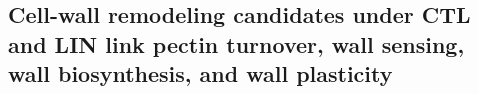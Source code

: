 \documentclass[9pt,twocolumn,twoside]{rilabRxiv}
\begin{document}



\subsection{Cell-wall remodeling candidates under CTL and LIN link pectin turnover, wall sensing, wall biosynthesis, and wall plasticity}
\end{document}
